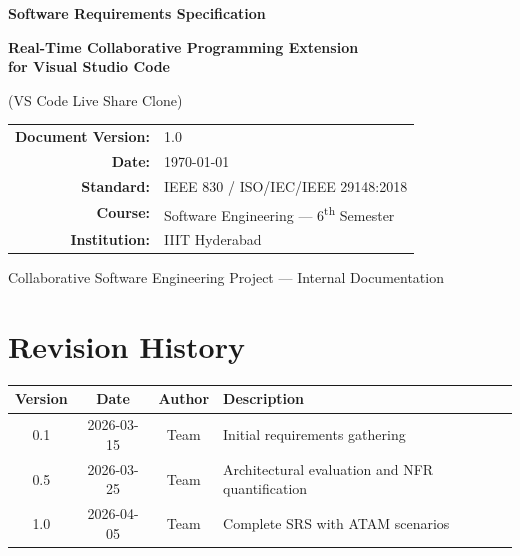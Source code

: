 \documentclass[12pt, a4paper, oneside]{article}
\begin{document}
\begin{titlepage}
\centering
\vspace*{1.5cm}

\begin{center}
{\Huge\bfseries\color{sectioncolor} Software Requirements Specification}
\end{center}

\vspace{1.2cm}
{\LARGE\bfseries\color{primaryblue} Real-Time Collaborative Programming Extension\\[4pt]
for Visual Studio Code}

\vspace{0.8cm}
{\large (VS Code Live Share Clone)}

\vspace{2cm}
\begin{tabular}{rl}
  \textbf{Document Version:} & 1.0 \\
  \textbf{Date:}             & \today \\
  \textbf{Standard:}         & IEEE 830 / ISO/IEC/IEEE 29148:2018 \\
  \textbf{Course:}           & Software Engineering --- 6\textsuperscript{th} Semester \\
  \textbf{Institution:}      & IIIT Hyderabad \\
\end{tabular}

\vfill
{\small\color{gray} Collaborative Software Engineering Project --- Internal Documentation}
\end{titlepage}

\newpage
\section*{Revision History}
\begin{table}[H]
\centering
\begin{tabularx}{\textwidth}{c c c X}
\toprule
\textbf{Version} & \textbf{Date} & \textbf{Author} & \textbf{Description} \\
\midrule
0.1 & 2026-03-15 & Team & Initial requirements gathering \\
0.5 & 2026-03-25 & Team & Architectural evaluation and NFR quantification \\
1.0 & 2026-04-05 & Team & Complete SRS with ATAM scenarios \\
\bottomrule
\end{tabularx}
\end{table}
\end{document}
